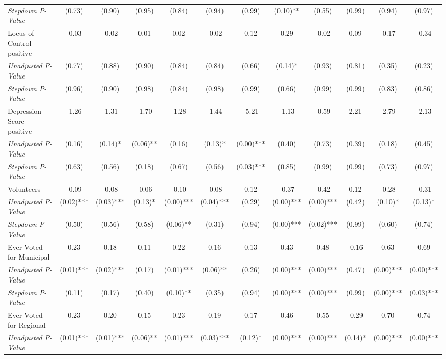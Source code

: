 \begin{tabular}{l c c c c c c c c c c c}
\quad \textit{Stepdown P-Value} & (0.73) & (0.90) & (0.95) & (0.84) & (0.94) & (0.99) & (0.10)** & (0.55) & (0.99) & (0.94) & (0.97) \\
Locus of Control - positive & -0.03 & -0.02 & 0.01 & 0.02 & -0.02 & 0.12 & 0.29 & -0.02 & 0.09 & -0.17 & -0.34 \\
\quad \textit{Unadjusted P-Value} & (0.77) & (0.88) & (0.90) & (0.84) & (0.84) & (0.66) & (0.14)* & (0.93) & (0.81) & (0.35) & (0.23) \\
\quad \textit{Stepdown P-Value} & (0.96) & (0.90) & (0.98) & (0.84) & (0.98) & (0.99) & (0.66) & (0.99) & (0.99) & (0.83) & (0.86) \\
Depression Score - positive & -1.26 & -1.31 & -1.70 & -1.28 & -1.44 & -5.21 & -1.13 & -0.59 & 2.21 & -2.79 & -2.13 \\
\quad \textit{Unadjusted P-Value} & (0.16) & (0.14)* & (0.06)** & (0.16) & (0.13)* & (0.00)*** & (0.40) & (0.73) & (0.39) & (0.18) & (0.45) \\
\quad \textit{Stepdown P-Value} & (0.63) & (0.56) & (0.18) & (0.67) & (0.56) & (0.03)*** & (0.85) & (0.99) & (0.99) & (0.73) & (0.97) \\
Volunteers & -0.09 & -0.08 & -0.06 & -0.10 & -0.08 & 0.12 & -0.37 & -0.42 & 0.12 & -0.28 & -0.31 \\
\quad \textit{Unadjusted P-Value} & (0.02)*** & (0.03)*** & (0.13)* & (0.00)*** & (0.04)*** & (0.29) & (0.00)*** & (0.00)*** & (0.42) & (0.10)* & (0.13)* \\
\quad \textit{Stepdown P-Value} & (0.50) & (0.56) & (0.58) & (0.06)** & (0.31) & (0.94) & (0.00)*** & (0.02)*** & (0.99) & (0.60) & (0.74) \\
Ever Voted for Municipal & 0.23 & 0.18 & 0.11 & 0.22 & 0.16 & 0.13 & 0.43 & 0.48 & -0.16 & 0.63 & 0.69 \\
\quad \textit{Unadjusted P-Value} & (0.01)*** & (0.02)*** & (0.17) & (0.01)*** & (0.06)** & (0.26) & (0.00)*** & (0.00)*** & (0.47) & (0.00)*** & (0.00)*** \\
\quad \textit{Stepdown P-Value} & (0.11) & (0.17) & (0.40) & (0.10)** & (0.35) & (0.94) & (0.00)*** & (0.00)*** & (0.99) & (0.00)*** & (0.03)*** \\
Ever Voted for Regional & 0.23 & 0.20 & 0.15 & 0.23 & 0.19 & 0.17 & 0.46 & 0.55 & -0.29 & 0.70 & 0.74 \\
\quad \textit{Unadjusted P-Value} & (0.01)*** & (0.01)*** & (0.06)** & (0.01)*** & (0.03)*** & (0.12)* & (0.00)*** & (0.00)*** & (0.14)* & (0.00)*** & (0.00)*** \\

\end{tabular}
